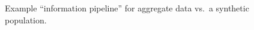 \documentclass[fancy, twoside, mastersfancy, ms]{byuthesis}
\begin{document}
\begin{figure}

\begin{minipage}{\linewidth}



\end{minipage}%
\newline
\begin{minipage}{\linewidth}



\end{minipage}%

\caption{\label{fig-pipeline-example}Example ``information pipeline''
for aggregate data vs.~a synthetic population.}

\end{figure}%
\end{document}
